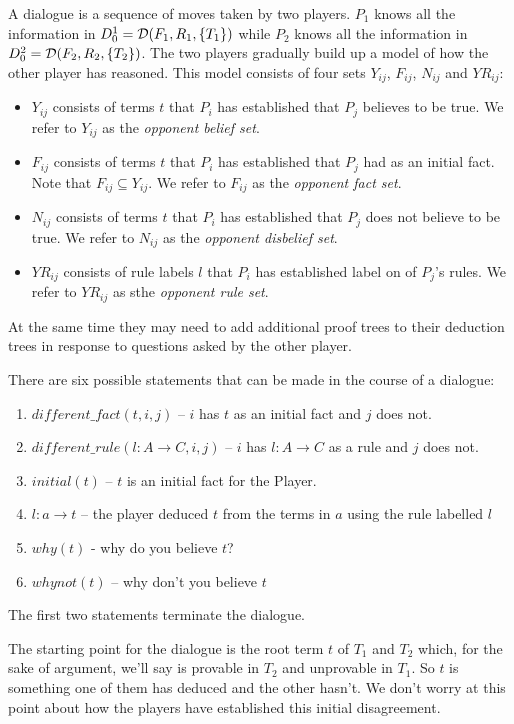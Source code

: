 \documentclass{blue-book}
\newcommand{\drule}[3]{\ensuremath{#1:#2 \rightarrow #3}}
\newcommand{\deduction}[3]{\ensuremath{{\cal D}(#1, #2, #3)}}
\begin{document}
A dialogue is a sequence of moves taken by two players.  $P_1$ knows all the information in $D^1_0 = \deduction{F_1}{R_1}{\{T_1\}}$ while $P_2$ knows all the information in $D^2_0 = \deduction{F_2}{R_2}{\{T_2\}}$.  The two players gradually build up a model of how the other player has reasoned.  This model consists of four sets $Y_{ij}$, $F_{ij}$, $N_{ij}$ and $YR_{ij}$: 
\begin{itemize}
\item $Y_{ij}$ consists of terms $t$ that $P_i$ has established that $P_j$ believes to be true.  We refer to $Y_{ij}$ as the \emph{opponent belief set}.
\item $F_{ij}$ consists of terms $t$ that $P_i$ has established that $P_j$ had as an initial fact.  Note that $F_{ij} 
\subseteq Y_{ij}$.  We refer to $F_{ij}$ as the \emph{opponent fact set}.
\item$N_{ij}$ consists of terms $t$ that $P_i$ has established that $P_j$ does not believe to be true.  We refer to $N_{ij}$ as the \emph{opponent disbelief set}.
\item $YR_{ij}$ consists of rule labels $l$ that $P_i$ has established label on of $P_j$'s rules.  We refer to $YR_{ij}$ as sthe \emph{opponent rule set}.
\end{itemize}
At the same time they may need to add additional proof trees to their deduction trees in response to questions asked by the other player.

There are six possible statements that can be made in the course of a dialogue:
\begin{enumerate}
\item $\mathit{different\_fact(t, i, j)}$ -- $i$ has $t$ as an initial fact and $j$ does not.
\item $\mathit{different\_rule(\drule{l}{A}{C}, i, j)}$ -- $i$ has $\drule{l}{A}{C}$ as a rule and $j$ does not.
\item $initial(t)$ -- $t$ is an initial fact for the Player.
\item $\drule{l}{a}{t}$ -- the player deduced $t$ from the terms in $a$ using the rule labelled $l$
\item $why(t)$ - why do you believe $t$?
\item $whynot(t)$ -- why don't you believe $t$
\end{enumerate}
The first two statements terminate the dialogue.


The starting point for the dialogue is the root term $t$ of $T_1$ and $T_2$ which, for the sake of argument, we'll say is provable in $T_2$ and unprovable in $T_1$.  So $t$ is something one of them has deduced and the other hasn't.  We don't worry at this point about how the players have established this initial disagreement.  
\end{document}
